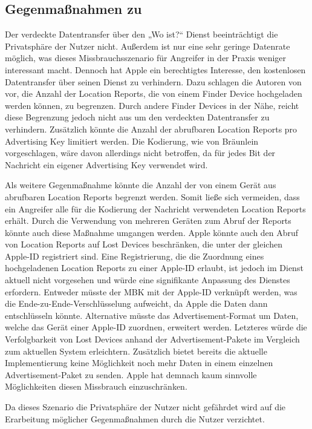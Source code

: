 \subsection{Gegenmaßnahmen zu }
Der verdeckte Datentransfer über den „Wo ist?“ Dienst beeinträchtigt die Privatsphäre der Nutzer nicht.
Außerdem ist nur eine sehr geringe Datenrate möglich, was dieses Missbrauchsszenario für Angreifer in der Praxis weniger interessant macht.
Dennoch hat Apple ein berechtigtes Interesse, den kostenlosen Datentransfer über seinen Dienst zu verhindern.
Dazu schlagen die Autoren von \cite{Tonetto_FindMy} vor, die Anzahl der Location Reports, die von einem Finder Device hochgeladen werden können, zu begrenzen.
Durch andere Finder Devices in der Nähe, reicht diese Begrenzung jedoch nicht aus um den verdeckten Datentransfer zu verhindern.
Zusätzlich könnte die Anzahl der abrufbaren Location Reports pro Advertising Key limitiert werden.
Die Kodierung, wie von Bräunlein \cite{braeunlein_sendmy} vorgeschlagen, wäre davon allerdings nicht betroffen, da für jedes Bit der Nachricht ein eigener Advertising Key verwendet wird.

Als weitere Gegenmaßnahme könnte die Anzahl der von einem Gerät aus abrufbaren Location Reports begrenzt werden.
Somit ließe sich vermeiden, dass ein Angreifer alle für die Kodierung der Nachricht verwendeten Location Reports erhält.
Durch die Verwendung von mehreren Geräten zum Abruf der Reports könnte auch diese Maßnahme umgangen werden.
Apple könnte auch den Abruf von Location Reports auf Lost Devices beschränken, die unter der gleichen Apple-ID registriert sind.
Eine Registrierung, die die Zuordnung eines hochgeladenen Location Reports zu einer Apple-ID erlaubt, ist jedoch im Dienst aktuell nicht vorgesehen und würde eine signifikante Anpassung des Dienstes erfordern.
Entweder müsste der \ac{MBK} mit der Apple-ID verknüpft werden, was die Ende-zu-Ende-Verschlüsselung aufweicht, da Apple die Daten dann entschlüsseln könnte.
Alternative müsste das Advertisement-Format um Daten, welche das Gerät einer Apple-ID zuordnen, erweitert werden.
Letzteres würde die Verfolgbarkeit von Lost Devices anhand der Advertisement-Pakete im Vergleich zum aktuellen System erleichtern.
Zusätzlich bietet bereits die aktuelle Implementierung keine Möglichkeit noch mehr Daten in einem einzelnen Advertisement-Paket zu senden.
Apple hat demnach kaum sinnvolle Möglichkeiten diesen Missbrauch einzuschränken.

Da dieses Szenario die Privatsphäre der Nutzer nicht gefährdet wird auf die Erarbeitung möglicher Gegenmaßnahmen durch die Nutzer verzichtet.

